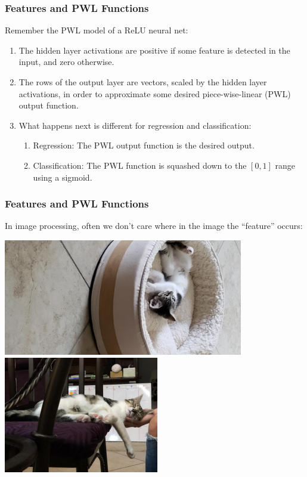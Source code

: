 \documentclass{beamer}
\begin{document}
\begin{frame}
  \frametitle{Features and PWL Functions}

  Remember the PWL model of a ReLU neural net:
  \begin{enumerate}
  \item The hidden layer activations are positive if some feature is
    detected in the input, and zero otherwise.
  \item The rows of the output layer are vectors, scaled by the hidden
    layer activations, in order to approximate some desired
    piece-wise-linear (PWL) output function.
  \item What happens next is different for regression and
    classification:
    \begin{enumerate}
    \item Regression: The PWL output function is the desired output.
    \item Classification: The PWL function is squashed down to the
      $[0,1]$ range using a sigmoid.
    \end{enumerate}
  \end{enumerate}
\end{frame}
       
\begin{frame}
  \frametitle{Features and PWL Functions}

  In image processing, often we don't care where in the image the
  ``feature'' occurs:
  \centerline{\includegraphics[height=2in]{figs/kitten.jpg}\hspace*{1cm}
    \includegraphics[height=2in]{figs/IMG-20200826-WA0000.jpg}}
\end{frame}
\end{document}
